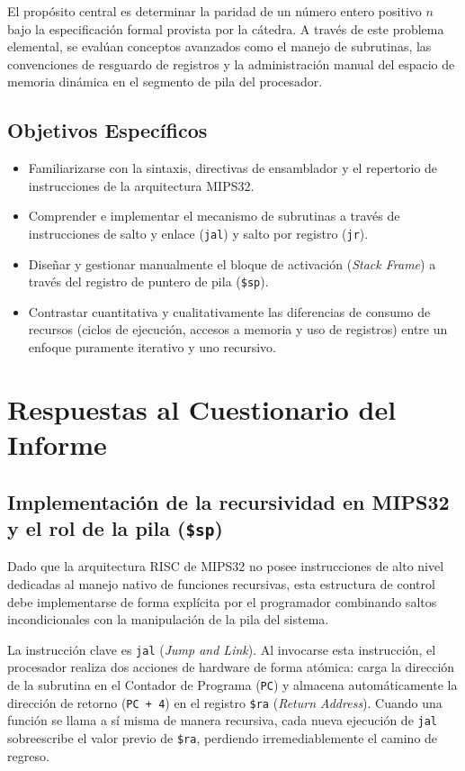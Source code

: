 \documentclass[12pt,letterpaper]{article}
\begin{document}
El propósito central es determinar la paridad de un número entero positivo $n$ bajo la especificación formal provista por la cátedra. A través de este problema elemental, se evalúan conceptos avanzados como el manejo de subrutinas, las convenciones de resguardo de registros y la administración manual del espacio de memoria dinámica en el segmento de pila del procesador.

\subsection{Objetivos Específicos}
\begin{itemize}
    \item Familiarizarse con la sintaxis, directivas de ensamblador y el repertorio de instrucciones de la arquitectura MIPS32.
    \item Comprender e implementar el mecanismo de subrutinas a través de instrucciones de salto y enlace (\texttt{jal}) y salto por registro (\texttt{jr}).
    \item Diseñar y gestionar manualmente el bloque de activación (\textit{Stack Frame}) a través del registro de puntero de pila (\texttt{\$sp}).
    \item Contrastar cuantitativa y cualitativamente las diferencias de consumo de recursos (ciclos de ejecución, accesos a memoria y uso de registros) entre un enfoque puramente iterativo y uno recursivo.
\end{itemize}

\newpage

\section{Respuestas al Cuestionario del Informe}

\subsection{Implementación de la recursividad en MIPS32 y el rol de la pila (\texttt{\$sp})}
Dado que la arquitectura RISC de MIPS32 no posee instrucciones de alto nivel dedicadas al manejo nativo de funciones recursivas, esta estructura de control debe implementarse de forma explícita por el programador combinando saltos incondicionales con la manipulación de la pila del sistema.

La instrucción clave es \texttt{jal} (\textit{Jump and Link}). Al invocarse esta instrucción, el procesador realiza dos acciones de hardware de forma atómica: carga la dirección de la subrutina en el Contador de Programa (\texttt{PC}) y almacena automáticamente la dirección de retorno (\texttt{PC + 4}) en el registro \texttt{\$ra} (\textit{Return Address}). Cuando una función se llama a sí misma de manera recursiva, cada nueva ejecución de \texttt{jal} sobreescribe el valor previo de \texttt{\$ra}, perdiendo irremediablemente el camino de regreso.
\end{document}
